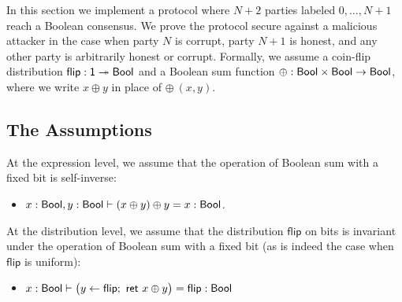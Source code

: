 \renewcommand{\flip}{\mathsf{flip}}
\renewcommand{\id}{\mathsf{id}}
\renewcommand{\adv}{\mathsf{adv}}
\newcommand{\party}{\mathsf{party}}
\newcommand{\comm}{\mathsf{comm}}
\renewcommand{\Flip}{\mathsf{Flip}}
\newcommand{\Commit}{\mathsf{Commit}}
\newcommand{\Committed}{\mathsf{Committed}}
\newcommand{\Open}{\mathsf{Open}}
\newcommand{\Opened}{\mathsf{Opened}}
\newcommand{\SumCommit}{\mathsf{SumCommit}}
\newcommand{\AllCommitted}{\mathsf{AllCommitted}}
\newcommand{\AllOpen}{\mathsf{AllOpen}}
\newcommand{\SumOpened}{\mathsf{SumOpened}}
\renewcommand{\Out}{\mathsf{Out}}
\newcommand{\LastCommit}{\mathsf{LastCommit}}
\renewcommand{\LeakFlip}{\mathsf{LeakFlip}}
\newcommand{\Ok}{\mathsf{Ok}}
\newcommand{\AdvCommit}{\mathsf{AdvCommit}}
\newcommand{\LeakCommitted}{\mathsf{LeakCommitted}}
\newcommand{\AdvOpen}{\mathsf{AdvOpen}}
\newcommand{\LeakOpened}{\mathsf{LeakOpened}}

In this section we implement a protocol where $N+2$ parties labeled $0,\ldots,N+1$ reach a Boolean consensus. We prove the protocol secure against a malicious attacker in the case when party $N$ is corrupt, party $N+1$ is honest, and any other party is arbitrarily honest or corrupt. Formally, we assume a coin-flip distribution $\flip : \one \twoheadrightarrow \Bool$ and a Boolean sum function $\oplus : \mathsf{Bool} \times \mathsf{Bool} \rightarrow \mathsf{Bool}$, where we write $x \oplus y$ in place of $\oplus \ (x,y)$.

\subsection{The Assumptions}
At the expression level, we assume that the operation of Boolean sum with a fixed bit is self-inverse:
\begin{itemize}
\item $x : \mathsf{Bool}, y : \mathsf{Bool} \vdash (x \oplus y) \oplus y = x : \mathsf{Bool}$.
\end{itemize}
At the distribution level, we assume that the distribution $\flip$ on bits is invariant under the operation of Boolean sum with a fixed bit (as is indeed the case when $\flip$ is uniform):
\begin{itemize}
\item $x : \Bool \vdash \big(y \leftarrow \flip; \ \ret{x \oplus y}\big) = \flip : \Bool$
\end{itemize}

